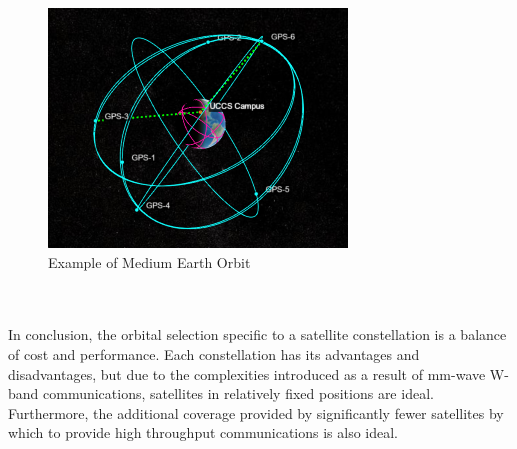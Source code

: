 \documentclass[conference]{IEEEtran}
\begin{document}
\begin{figure}[h]
\centerline{\includegraphics{constellation4copy.png}}
\caption{Example of Medium Earth Orbit}
\label{fig:6}
\end{figure}
\\\\In conclusion, the orbital selection specific to a satellite constellation is a balance of cost and performance. Each constellation has its advantages and disadvantages, but due to the complexities introduced as a result of mm-wave W-band communications, satellites in relatively fixed positions are ideal. Furthermore, the additional coverage provided by significantly fewer satellites by which to provide high throughput communications is also ideal. 
\end{document}
